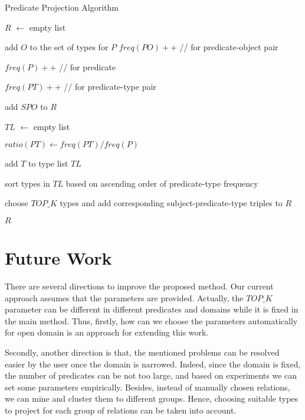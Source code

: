 \documentclass{acm_proc_article-sp}
\begin{document}
\begin{algorithm}
\label{algo1}
\caption{Predicate Projection Algorithm}

\SetAlgoLined
{}
$R$ $\leftarrow$ empty list

 {
	 {
		add $O$ to the set of types for $P$
	}
	$freq(PO)++$  //  for predicate-object pair

	$freq(P)++$  //  for predicate
}

 {
	 {
		$freq(PT)++$  //  for predicate-type pair
	}
}

 {
	 {
		add $SPO$ to $R$
	}
}
 {

	$TL$ $\leftarrow$ empty list

	 {
		$ratio(PT) \leftarrow freq(PT) / freq(P)$

		 {
			add $T$ to type list $TL$
		}
	}
	sort types in $TL$ based on ascending order of predicate-type frequency

	choose $TOP\_K$ types and add corresponding subject-predicate-type triples to $R$

}

\Return $R$

\end{algorithm}

\section{Future Work}

There are several directions to improve the proposed method. Our current approach assumes that the parameters are provided. Actually, the $TOP\_K$ parameter can be different in different predicates and domains while it is fixed in the main method. Thus, firstly, how can we choose the parameters automatically for open domain is an approach for extending this work.

Secondly, another direction is that, the mentioned problems can be resolved easier by the user once the domain is narrowed. Indeed, since the domain is fixed, the number of predicates can be not too large, and based on experiments we can set some parameters empirically. Besides, instead of manually chosen relations, we can mine and cluster them to different groups. Hence, choosing suitable types to project for each group of relations can be taken into account.



\end{document}
